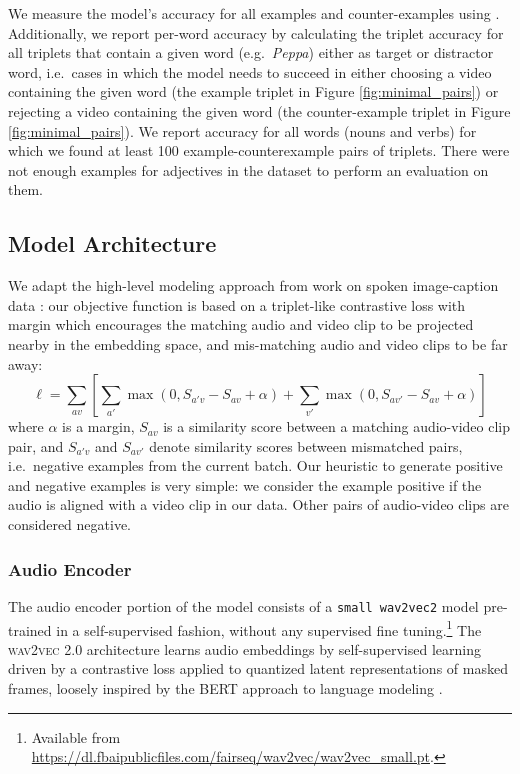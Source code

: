 We measure the model's accuracy for all examples and counter-examples using
 . Additionally, we report per-word accuracy by
calculating the triplet accuracy for all triplets that contain a given
word (e.g.\ \textit{Peppa}) either as target or distractor word, i.e.\ cases
in which the model needs to succeed in either choosing a video
containing the given word (the example triplet in Figure
\ref{fig:minimal_pairs}) or rejecting a video containing the given
word (the counter-example triplet in Figure
\ref{fig:minimal_pairs}).
We report accuracy for all words (nouns and verbs) for which we found at least 
100 example-counterexample pairs of triplets. There were not enough examples 
for adjectives in the dataset to perform an evaluation on them. 



\subsection{Model Architecture}
\label{sec:model}
We adapt the high-level modeling approach from work on spoken
image-caption data
\citep{harwath2016unsupervised,chrupala-etal-2017-representations}:
our objective function is based on a triplet-like contrastive loss with margin which
encourages the matching audio and video clip to be projected nearby in
the embedding space, and mis-matching audio and video clips to be far
away:
\begin{dmath}
  \ell = \sum_{av}\left[\sum_{a'} \max(0, S_{a'v} - S_{av} +
    \alpha) + \sum_{v'} \max(0, S_{av'} - S_{av} + \alpha) \right]
  \label{eq:triplet}
\end{dmath}
where $\alpha$ is a margin, $S_{av}$ is a similarity score between a
matching audio-video clip pair, and $S_{a'v}$ and $S_{av'}$ denote
similarity scores between mismatched pairs, i.e.\ negative examples
from the current batch. Our heuristic to generate positive and
negative examples is very simple: we consider the example
positive if the audio is aligned with a video clip in our
data. Other pairs of audio-video clips are considered negative.

\subsubsection{Audio Encoder}
The audio encoder portion of the model consists of a {\tt small
  wav2vec2} model \citep{wav2vec2} pre-trained in a self-supervised
fashion, without any supervised fine tuning.\footnote{Available from
  \url{https://dl.fbaipublicfiles.com/fairseq/wav2vec/wav2vec_small.pt}.}
The \textsc{wav2vec 2.0} architecture learns audio embeddings by
self-supervised learning driven by a contrastive loss applied to 
quantized latent representations of masked frames, loosely inspired by
the BERT approach to language modeling \citep{devlin-etal-2019-bert}.

